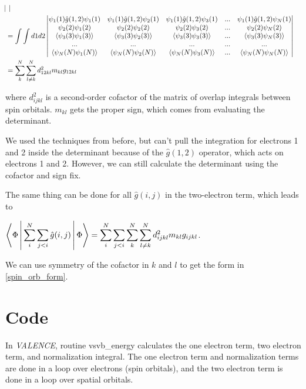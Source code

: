 \documentclass[a4paper]{article}
\begin{document}
\begin{equation}
\begin{aligned}
{\begin{vmatrix}
    \end{vmatrix} } \\
        &=  \int  \int  d1d2
   \begin{vmatrix}  
      \psi_1(1)\hat{g}(1,2) \psi_1(1) & \psi_1(1) \hat{g}(1,2) \psi_2(1)& \psi_1(1) \hat{g}(1,2) \psi_3(1) & ... & \psi_1(1)\hat{g}(1,2)\psi_N(1) \\
    \psi_2(2) \psi_1(2) & \psi_2(2)\psi_2(2) & \psi_2(2) \psi_3(2) &...& \psi_2(2)\psi_N(2) \\
     \Braket{\psi_3(3) \psi_1(3)} &  \Braket{\psi_3(3)\psi_2(3) }&  \Braket{\psi_3(3) \psi_3(3)} &...& \Braket{ \psi_3(3)\psi_N(3) }\\
    ... & ... & ... & ...& ... \\
    \Braket{ \psi_N(N) \psi_1(N) }& \Braket{\psi_N(N) \psi_2(N) }&  \Braket{\psi_N(N) \psi_3(N)} &...&  \Braket{\psi_N(N)\psi_N(N)}\\
    \end{vmatrix}  
     \\   &= 
     \sum_k^N\sum_{l \neq k}^N d^2_{12kl}m_{kl}g_{12kl} 
    \label{deriv_twoe}
 \end{aligned}
 \end{equation}


where $d^2_{ijkl}$ is a second-order cofactor of the matrix of overlap integrals between spin orbitals. $m_{kl}$ gets the proper sign, which comes from evaluating the determinant.

We used the techniques from before, but can't pull the integration for electrons 1 and 2 inside the determinant because of the $\hat{g}(1,2)$ operator, which acts on electrons 1 and 2. 
However, we can still calculate the determinant using the cofactor and sign fix. 

The same thing can be done for all $\hat{g}(i,j)$ in the two-electron term, which leads to 

$\displaystyle \Braket{\Phi| \sum_i^N\sum_{j<i} \hat{g}(i,j) |\Phi } =   \sum_i^N\sum_{j<i} \sum_k^N\sum_{l \neq k}^N d^2_{ijkl}m_{kl}g_{ijkl}  $.

We can use symmetry of the cofactor in $k$ and $l$ to get the form in \ref{spin_orb_form}.

\section{Code} 

In \emph{VALENCE}, routine vsvb\_energy calculates the one electron term, two electron term, and normalization integral. The one electron term and normalization terms are done in a loop over electrons (spin orbitals), and the two electron term is done in a loop over spatial orbitals.
\end{document}
